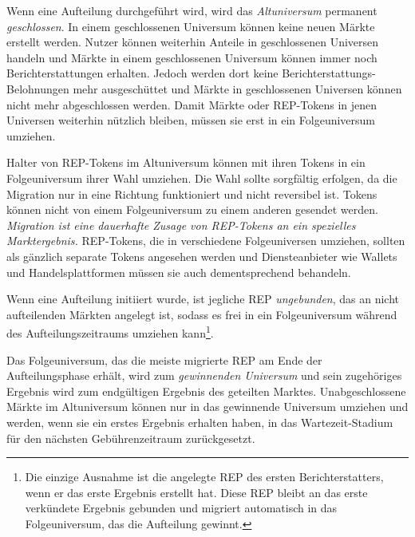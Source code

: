 \documentclass[floatfix,reprint,nofootinbib,amsmath,amssymb,epsfig,pre,floats,letterpaper,groupedaffiliation]{revtex4-1}
\theoremstyle{definition}
\theoremstyle{definition}
\theoremstyle{definition}
\begin{document}
Wenn eine Aufteilung durchgeführt wird, wird das \textit{Altuniversum} permanent \textit{geschlossen}. In einem geschlossenen Universum können keine neuen Märkte erstellt werden. Nutzer können weiterhin Anteile in geschlossenen Universen handeln und Märkte in einem geschlossenen Universum können immer noch Berichterstattungen erhalten. Jedoch werden dort keine Berichterstattungs-Belohnungen mehr ausgeschüttet und Märkte in geschlossenen Universen können nicht mehr abgeschlossen werden. Damit Märkte oder REP-Tokens in jenen Universen weiterhin nützlich bleiben, müssen sie erst in ein Folgeuniversum umziehen.

Halter von REP-Tokens im Altuniversum können mit ihren Tokens in ein Folgeuniversum ihrer Wahl umziehen. Die Wahl sollte sorgfältig erfolgen, da die Migration nur in eine Richtung funktioniert und nicht reversibel ist. Tokens können nicht von einem Folgeuniversum zu einem anderen gesendet werden. \textit{Migration ist eine dauerhafte Zusage von REP-Tokens an ein spezielles Marktergebnis.} REP-Tokens, die in verschiedene Folgeuniversen umziehen, sollten als gänzlich separate Tokens angesehen werden und Diensteanbieter wie Wallets und Handelsplattformen müssen sie auch dementsprechend behandeln.

Wenn eine Aufteilung initiiert wurde, ist jegliche REP \textit{ungebunden}, das an nicht aufteilenden Märkten angelegt ist, sodass es frei in ein Folgeuniversum während des Aufteilungszeitraums umziehen kann\footnote{Die einzige Ausnahme ist die angelegte REP des ersten Berichterstatters, wenn er das erste Ergebnis erstellt hat. Diese REP bleibt an das erste verkündete Ergebnis gebunden und migriert automatisch in das Folgeuniversum, das die Aufteilung gewinnt.}.

Das Folgeuniversum, das die meiste migrierte REP am Ende der Aufteilungsphase erhält, wird zum \textit{gewinnenden Universum} und sein zugehöriges Ergebnis wird zum endgültigen Ergebnis des geteilten Marktes. Unabgeschlossene Märkte im Altuniversum können nur in das gewinnende Universum umziehen und werden, wenn sie ein erstes Ergebnis erhalten haben, in das Wartezeit-Stadium für den nächsten Gebührenzeitraum zurückgesetzt.
\end{document}
